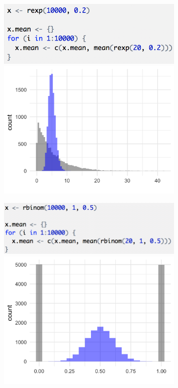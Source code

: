 \begin{figure}[h]
\begin{center}
\begin{subfigure}{0.4\textwidth}
    \end{subfigure}
    \begin{subfigure}{0.4\textwidth}
    \includegraphics[width=\textwidth]{img/clt-rexp-code.png}
    \includegraphics[width=\textwidth]{img/hyp-exp-mean.png}
    \end{subfigure}
    \begin{subfigure}{0.4\textwidth}
    \includegraphics[width=\textwidth]{img/clt-binom-code.png}
    \includegraphics[width=\textwidth]{img/hyp-sum-mean.png}

\end{subfigure}
\end{center}
\end{figure}
